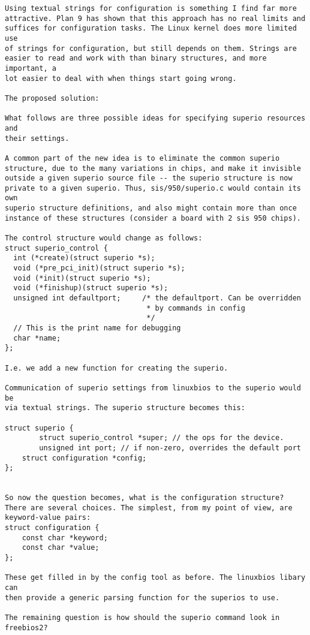 \begin{verbatim}
Using textual strings for configuration is something I find far more
attractive. Plan 9 has shown that this approach has no real limits and
suffices for configuration tasks. The Linux kernel does more limited use
of strings for configuration, but still depends on them. Strings are
easier to read and work with than binary structures, and more important, a
lot easier to deal with when things start going wrong.

The proposed solution:

What follows are three possible ideas for specifying superio resources and
their settings.

A common part of the new idea is to eliminate the common superio
structure, due to the many variations in chips, and make it invisible
outside a given superio source file -- the superio structure is now
private to a given superio. Thus, sis/950/superio.c would contain its own
superio structure definitions, and also might contain more than once
instance of these structures (consider a board with 2 sis 950 chips).

The control structure would change as follows:
struct superio_control {
  int (*create)(struct superio *s);
  void (*pre_pci_init)(struct superio *s);
  void (*init)(struct superio *s);
  void (*finishup)(struct superio *s);
  unsigned int defaultport;     /* the defaultport. Can be overridden
                                 * by commands in config
                                 */
  // This is the print name for debugging
  char *name;
};

I.e. we add a new function for creating the superio.

Communication of superio settings from linuxbios to the superio would be
via textual strings. The superio structure becomes this:

struct superio {
        struct superio_control *super; // the ops for the device.
        unsigned int port; // if non-zero, overrides the default port
	struct configuration *config;
};


So now the question becomes, what is the configuration structure?
There are several choices. The simplest, from my point of view, are
keyword-value pairs:
struct configuration {
	const char *keyword;
	const char *value;
};

These get filled in by the config tool as before. The linuxbios libary can
then provide a generic parsing function for the superios to use.

The remaining question is how should the superio command look in
freebios2?


\end{verbatim}
